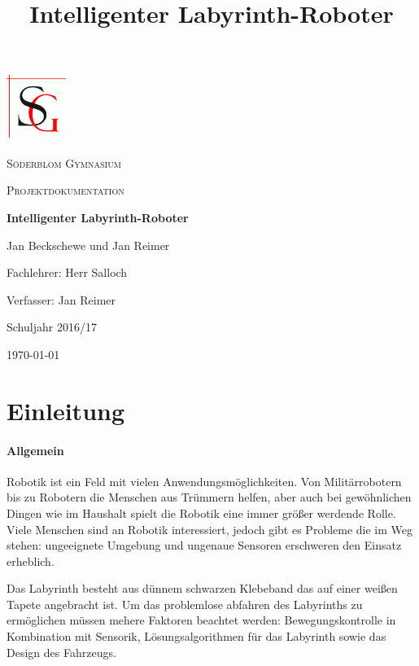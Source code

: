 \documentclass[12pt]{article}
\title{Intelligenter Labyrinth-Roboter}
\begin{document}
\begin{titlepage}
	\centering
	\includegraphics[width=0.15\textwidth]{images/sg-logo.png}\par\vspace{1cm}
	{\scshape\LARGE Söderblom Gymnasium \par}
	\vspace{1cm}
	{\scshape\Large Projektdokumentation\par}
	\vspace{1.5cm}
	{\huge\bfseries Intelligenter Labyrinth-Roboter\par}
	\vspace{1.5cm}
	{\Large Jan Beckschewe und Jan Reimer \par}
	\vspace{1.5cm}
	Fachlehrer: Herr Salloch \par
    \vspace{0.5cm}
    Verfasser: Jan Reimer \par
    \vspace{1cm}
	Schuljahr 2016/17 \par
    
	\vfill

	{\large \today\par}
\end{titlepage}
\restoregeometry
\tableofcontents
\thispagestyle{empty}
\newpage
\setcounter{page}{3}
\section{Einleitung}
\paragraph{Allgemein} Robotik ist ein Feld mit vielen Anwendungsmöglichkeiten. Von Militärrobotern bis zu Robotern die Menschen aus Trümmern helfen, aber auch bei gewöhnlichen Dingen wie im Haushalt spielt die Robotik eine immer größer werdende Rolle. Viele Menschen sind an Robotik interessiert, jedoch gibt es Probleme die im Weg stehen: ungeeignete Umgebung und ungenaue Sensoren erschweren den Einsatz erheblich.  

Das Labyrinth besteht aus dünnem schwarzen Klebeband das auf einer weißen Tapete angebracht ist. Um das problemlose abfahren des Labyrinths zu ermöglichen müssen mehere Faktoren beachtet werden: Bewegungskontrolle in Kombination mit Sensorik, Lösungsalgorithmen für das Labyrinth sowie das Design des Fahrzeugs.
\end{document}
